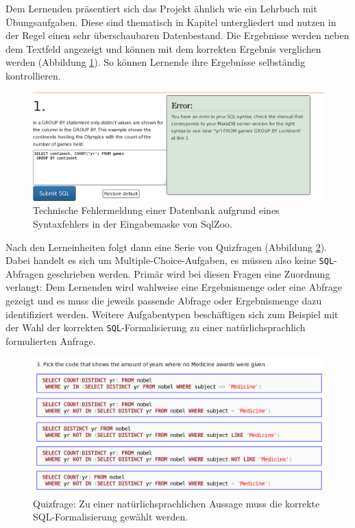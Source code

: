 Dem Lernenden präsentiert sich das Projekt ähnlich wie ein Lehrbuch mit Übungsaufgaben. Diese sind thematisch in Kapitel untergliedert und nutzen in der Regel einen sehr überschaubaren Datenbestand. Die Ergebnisse werden neben dem Textfeld angezeigt und können mit dem korrekten Ergebnis verglichen werden (Abbildung \ref{fig:sqlzoo-check-result}). So können Lernende ihre Ergebnisse selbständig kontrollieren.

\begin{figure}[h]
  \centering \includegraphics[width=\textwidth]{images/related-work-sql-zoo-error.png}
  \caption{Technische Fehlermeldung einer Datenbank aufgrund eines Syntaxfehlers in der Eingabemaske von SqlZoo.}
  \label{fig:sqlzoo-check-result}
\end{figure}

Nach den Lerneinheiten folgt dann eine Serie von Quizfragen (Abbildung \ref{fig:sqlzoo-quiz-sql-formalization}). Dabei handelt es sich um Multiple-Choice-Aufgaben, es müssen also keine \texttt{SQL}-Abfragen geschrieben werden. Primär wird bei diesen Fragen eine Zuordnung verlangt: Dem Lernenden wird wahlweise eine Ergebnismenge oder eine Abfrage gezeigt und es muss die jeweils passende Abfrage oder Ergebnismenge dazu identifiziert werden. Weitere Aufgabentypen beschäftigen sich zum Beispiel mit der Wahl der korrekten \texttt{SQL}-Formalisierung zu einer natürlichsprachlich formulierten Anfrage.

\begin{figure}[h]
  \centering \includegraphics[width=\textwidth]{images/related-work-sql-zoo-quiz-select-sql.png}
  \caption{Quizfrage: Zu einer natürlichsprachlichen Aussage muss die korrekte SQL-Formalisierung gewählt werden.}
  \label{fig:sqlzoo-quiz-sql-formalization}
\end{figure}

